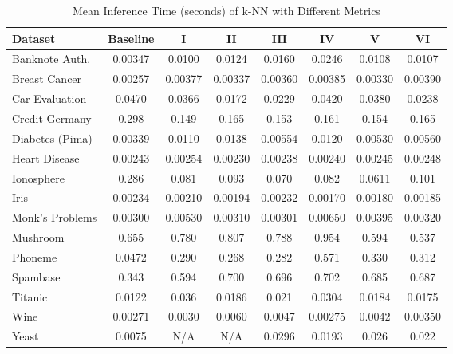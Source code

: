 \documentclass[conference]{IEEEtran}
\begin{document}
\begin{table*}[htbp]
\caption{Mean Inference Time (seconds) of k-NN with Different Metrics}
\label{tab:inference_time_results}
\begin{center}
\begin{tabular}{|l|c|c|c|c|c|c|c|}
\hline
\textbf{Dataset} & \textbf{Baseline} & \textbf{I} & \textbf{II} & \textbf{III} & \textbf{IV} & \textbf{V} & \textbf{VI} \\
\hline
Banknote Auth. & 0.00347 & 0.0100 & 0.0124 & 0.0160 & 0.0246 & 0.0108 & 0.0107 \\
Breast Cancer & 0.00257 & 0.00377 & 0.00337 & 0.00360 & 0.00385 & 0.00330 & 0.00390 \\
Car Evaluation & 0.0470 & 0.0366 & 0.0172 & 0.0229 & 0.0420 & 0.0380 & 0.0238 \\
Credit Germany & 0.298 & 0.149 & 0.165 & 0.153 & 0.161 & 0.154 & 0.165 \\
Diabetes (Pima) & 0.00339 & 0.0110 & 0.0138 & 0.00554 & 0.0120 & 0.00530 & 0.00560 \\
Heart Disease & 0.00243 & 0.00254 & 0.00230 & 0.00238 & 0.00240 & 0.00245 & 0.00248 \\
Ionosphere & 0.286 & 0.081 & 0.093 & 0.070 & 0.082 & 0.0611 & 0.101 \\
Iris & 0.00234 & 0.00210 & 0.00194 & 0.00232 & 0.00170 & 0.00180 & 0.00185 \\
Monk's Problems & 0.00300 & 0.00530 & 0.00310 & 0.00301 & 0.00650 & 0.00395 & 0.00320 \\
Mushroom & 0.655 & 0.780 & 0.807 & 0.788 & 0.954 & 0.594 & 0.537 \\
Phoneme & 0.0472 & 0.290 & 0.268 & 0.282 & 0.571 & 0.330 & 0.312 \\
Spambase & 0.343 & 0.594 & 0.700 & 0.696 & 0.702 & 0.685 & 0.687 \\
Titanic & 0.0122 & 0.036 & 0.0186 & 0.021 & 0.0304 & 0.0184 & 0.0175 \\
Wine & 0.00271 & 0.0030 & 0.0060 & 0.0047 & 0.00275 & 0.0042 & 0.00350 \\
Yeast & 0.0075 & N/A & N/A & 0.0296 & 0.0193 & 0.026 & 0.022 \\
\hline
\end{tabular}
\end{center}
\end{table*}
\end{document}
